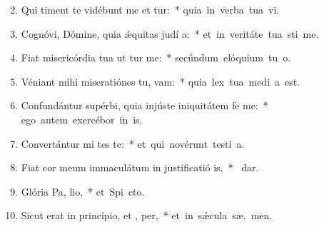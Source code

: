 \begin{flushleft}
\begin{enumerate}[leftmargin=*]
\setcounter{enumi}{1}

\item Qui timent te vidébunt me et tur:~* \mbox{quia in verba tua vi.}
\item Cognóvi, Dómine, quia \'{\ae}quitas judí a:~* \mbox{et in veritáte tua sti me.}
\item Fiat misericórdia tua ut tur me:~* \mbox{secúndum elóquium tu  o.}
\item Véniant mihi miseratiónes tu,  vam:~* \mbox{quia lex tua medi a est.}
\item Confundántur supérbi, quia injúste iniquitátem fe  me:~* \mbox{ego autem exercébor in  is.}
\item Convertántur mi tes te:~* \mbox{et qui novérunt testi a.}
\item Fiat cor meum immaculátum in justificatió is,~* \mbox{  dar.}
\item Glória Pa,  lio,~* \mbox{et Spi cto.}
\item Sicut erat in princípio, et ,  per,~* \mbox{et in s\'{\ae}cula sæ. men.}


\end{enumerate}
\end{flushleft}

